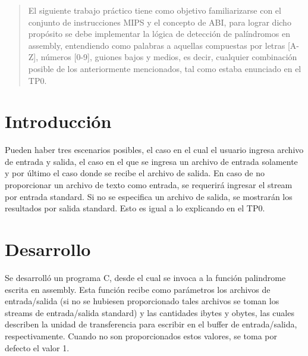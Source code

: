 \documentclass[a4paper]{article}
\begin{document}

\fecha{\today}


\maketitle

\begin{abstract}
El siguiente trabajo práctico tiene como objetivo familiarizarse con el conjunto de instrucciones MIPS y el concepto de ABI, para lograr dicho propósito se debe implementar la lógica de detección de palíndromos en assembly, entendiendo como palabras a aquellas compuestas por letras [A-Z], números [0-9], guiones bajos y medios, es decir, cualquier combinación posible de los anteriormente mencionados, tal como estaba enunciado en el TP0.
\end{abstract}


\section{Introducción}
Pueden haber tres escenarios posibles, el caso en el cual el usuario ingresa archivo de entrada y salida, el caso en el que se ingresa un archivo de entrada solamente y por último el caso donde se recibe el archivo de salida. En caso de no proporcionar un archivo de texto como entrada, se requerirá ingresar el stream por entrada standard. Si no se especifica un archivo de salida, se mostrarán los resultados por salida standard. Esto es igual a lo explicando en el TP0.


\section{Desarrollo}

Se desarrolló un programa C, desde el cual se invoca a la función palindrome escrita en assembly. Esta función recibe como parámetros los archivos de entrada/salida (si no se hubiesen proporcionado tales archivos se toman los streams de entrada/salida standard) y las cantidades ibytes y obytes, las cuales describen la unidad de transferencia para escribir en el buffer de entrada/salida, respectivamente. Cuando no son proporcionados estos valores, se toma por defecto el valor 1.
\end{document}
